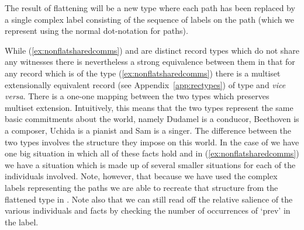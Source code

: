 The result of flattening \preveg{} will be a new type \nexteg{} where each path
has been replaced by a single complex label consisting of the sequence
of labels on the path (which we represent using the normal
dot-notation for paths).
\begin{ex} 
\label{ex:flatsharedcomms}
\end{ex} 
While (\ref{ex:nonflatsharedcomms}) and \preveg{} are distinct record types which do
not share any witnesses there is nevertheless a strong equivalence
between them in that for any record which is of the type
(\ref{ex:nonflatsharedcomms}) there is a multiset extensionally
equivalent record (see Appendix~\ref{app:rectypes}) of type \preveg{} and \textit{vice
  versa}.  There is a one-one mapping between the two types which
preserves multiset extension.  Intuitively, this means that the two
types represent the same basic commitments about the world, namely
Dudamel is a conducor, Beethoven is a composer, Uchida is a pianist
and Sam is a singer.  The difference between the two types involves
the structure they impose on this world.  In the case of \preveg{} we
have one big situation in which all of these facts hold and in
(\ref{ex:nonflatsharedcomms}) we have a situation which is made up of
several smaller situations for each of the individuals involved. Note,
however, that because we have used the complex labels representing the
paths we are able to recreate that structure from the flattened type
in \preveg{}.
Note also that we can still read off the relative salience of the
various individuals and facts by checking the number of occurrences
of `prev' in the label.

